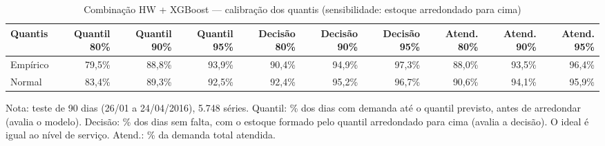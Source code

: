 \begin{table}[htbp]
\centering
\small
\caption{Combinação HW + XGBoost — calibração dos quantis (sensibilidade: estoque arredondado para cima)}
\label{tab:comb_calibracao_sensibilidade}
\begin{tabular}{lrrrrrrrrr}
\toprule
Quantis & Quantil 80\% & Quantil 90\% & Quantil 95\% & Decisão 80\% & Decisão 90\% & Decisão 95\% & Atend. 80\% & Atend. 90\% & Atend. 95\% \\
\midrule
Empírico & 79,5\% & 88,8\% & 93,9\% & 90,4\% & 94,9\% & 97,3\% & 88,0\% & 93,5\% & 96,4\% \\
Normal & 83,4\% & 89,3\% & 92,5\% & 92,4\% & 95,2\% & 96,7\% & 90,6\% & 94,1\% & 95,9\% \\
\bottomrule
\end{tabular}
\par\smallskip
{\footnotesize Nota: teste de 90 dias (26/01 a 24/04/2016), 5.748 séries. Quantil: \% dos dias com demanda até o quantil previsto, antes de arredondar (avalia o modelo). Decisão: \% dos dias sem falta, com o estoque formado pelo quantil arredondado para cima (avalia a decisão). O ideal é igual ao nível de serviço. Atend.: \% da demanda total atendida.}
\end{table}
